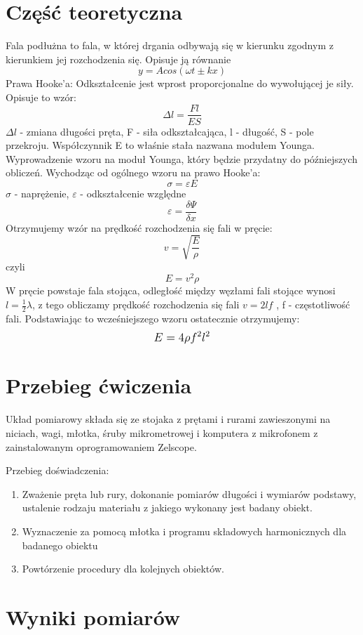 \documentclass[a4paper,11pt]{article}
\begin{document}
\section{Część teoretyczna}
 
Fala podłużna  to fala, w której drgania odbywają się w kierunku zgodnym z kierunkiem jej rozchodzenia się. 
Opisuje ją równanie $$ y= Acos(\omega t \pm kx) $$
Prawa Hooke'a: Odkształcenie jest wprost proporcjonalne do wywołującej je siły.
Opisuje to wzór: $$ \Delta l = \frac{Fl}{ES} $$
$\Delta l$ - zmiana długości pręta, F - siła odkształcająca, l - długość, S - pole przekroju.
Współczynnik E to właśnie stała nazwana modułem Younga.
Wyprowadzenie wzoru na moduł Younga, który będzie przydatny do późniejszych obliczeń.
Wychodząc od ogólnego wzoru na prawo Hooke'a: 
$$ \sigma = \varepsilon E $$  $\sigma $ - naprężenie, $\varepsilon $ - odkształcenie względne
$$ \varepsilon = \frac{\delta \Psi}{\delta x} $$
Otrzymujemy wzór na  prędkość rozchodzenia się fali w pręcie: 
$$ v = \sqrt{\frac{E}{\rho}} $$
czyli $$ E = v^2\rho $$
W pręcie powstaje fala stojąca, odległość między węzłami fali stojące wynosi $ l = \frac{1}{2} \lambda $, z tego obliczamy prędkość rozchodzenia się fali $ v = 2lf $ , f - częstotliwość fali.
Podstawiając to wcześniejszego wzoru ostatecznie otrzymujemy:
$$\mathlarger{E = 4\rho f^2 l^2}$$
 
 
\section{Przebieg ćwiczenia}

Układ pomiarowy składa się ze stojaka z prętami i rurami zawieszonymi na niciach, wagi, młotka, śruby mikrometrowej i komputera z mikrofonem z zainstalowanym oprogramowaniem Zelscope.

Przebieg doświadczenia:
\begin{enumerate}

    \item Zważenie pręta lub rury, dokonanie pomiarów długości i wymiarów podstawy, ustalenie rodzaju materiału z jakiego wykonany jest badany obiekt.
    \item Wyznaczenie za pomocą młotka i programu składowych harmonicznych dla badanego obiektu
    \item Powtórzenie procedury dla kolejnych obiektów.
     
            
\end{enumerate}

\section{Wyniki pomiarów}
\end{document}
